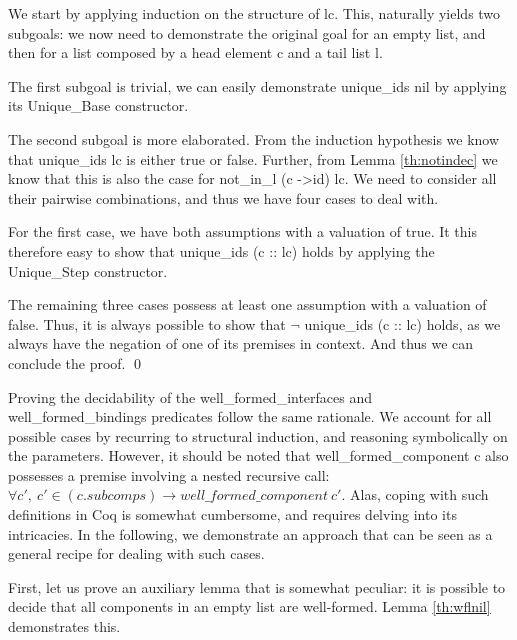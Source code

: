 	\begin{lemma} \label{th:uniquedec} 
				
		
				We start by applying induction on the structure of \textsf{lc}. This, naturally yields
			two subgoals: we now need to demonstrate the original goal for an empty list,
			and then for a list composed by a head element \textsf{c} and a tail list \textsf{l}.
			
				The first subgoal is trivial, we can easily demonstrate \textsf{unique\_ids nil}
			by applying its \textsf{Unique\_Base} constructor.				
				
				The second subgoal is more elaborated. From the induction hypothesis
			we know that \textsf{unique\_ids lc} is either true or false. Further, 
			from Lemma \ref{th:notindec} we know that this is also the case for 
			\textsf{not\_in\_l (c ->id) lc}. We need to consider all their pairwise 
			combinations, and thus we have four cases to deal with. 
			
				For the first case, we have both assumptions with a valuation of true. 
				It this therefore easy to show that \textsf{unique\_ids (c :: lc)} holds by applying
			the \textsf{Unique\_Step} constructor.
			
				The remaining three cases possess at least one assumption with
			a valuation of false. Thus, it is always possible to show that
			\textsf{$\neg$ unique\_ids (c :: lc)} holds, as we always have
			the negation of one of its premises in context. And thus we can conclude
			the proof. \qed
	\end{lemma}
	
		\noindent Proving the decidability of the \textsf{well\_formed\_interfaces} and
	\textsf{well\_formed\_bindings} predicates follow the same rationale. We account for
	all possible cases by recurring to structural induction, and reasoning symbolically on
	the parameters. However, it should be noted that \textsf{well\_formed\_component c} 
	also possesses a premise involving a nested recursive call: \textsf{$\forall c',\ c' \in (c.subcomps)
	\rightarrow well\_formed\_component \ c'$}. Alas, coping with 
	such definitions in Coq is somewhat cumbersome, and requires delving into its
	intricacies. In the following, we demonstrate an approach that can be seen as a general
	recipe for dealing with such cases.
	
			First, let us prove an auxiliary lemma that is somewhat peculiar: it is possible to decide that
	all components in an empty list are well-formed. Lemma \ref{th:wflnil} demonstrates this.			
			
